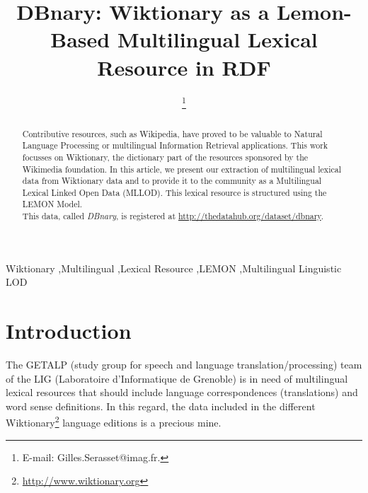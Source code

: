 \documentclass[sw]{iosart2c}
\begin{document}
\begin{frontmatter}

\title{DBnary: Wiktionary as a Lemon-Based Multilingual Lexical Resource in RDF}


\author{ \thanks{E-mail: Gilles.Serasset@imag.fr.}}
\address{GETALP-LIG, UJF-Grenoble 1 \\BP 53, 38051 Grenoble cedex 9, France\\ \texttt{gilles.serasset@imag.fr}}


\begin{abstract}
Contributive resources, such as Wikipedia, have proved to be valuable to Natural Language Processing or multilingual Information Retrieval applications. This work focusses on Wiktionary, the dictionary part of the resources sponsored by the Wikimedia foundation. In this article, we present our extraction of multilingual lexical data from Wiktionary data and to provide it to the community as a Multilingual Lexical Linked Open Data (MLLOD). This lexical resource is structured using the LEMON Model.\\
This data, called \textit{DBnary}, is registered at \url{http://thedatahub.org/dataset/dbnary}.
\end{abstract}

\begin{keyword}
Wiktionary \sep Multilingual \sep Lexical Resource \sep LEMON \sep Multilingual Linguistic LOD
\end{keyword}

\end{frontmatter}

\section{Introduction}

The GETALP (study group for speech and language translation/processing) team of the LIG (Laboratoire d'Informatique de Grenoble) is in need of multilingual lexical resources that should include language correspondences (translations) and word sense definitions. In this regard, the data included in the different Wiktionary\footnote{\url{http://www.wiktionary.org}} language editions is a precious mine.
\end{document}
